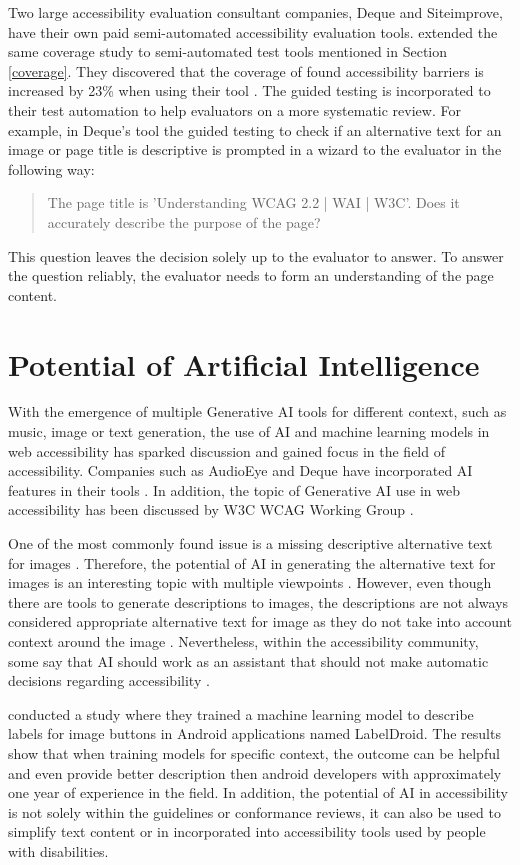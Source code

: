 Two large accessibility evaluation consultant companies, Deque and Siteimprove, have their own paid semi-automated accessibility evaluation tools. \textcite{dequecoverage_semi} extended the same coverage study to semi-automated test tools mentioned in Section \ref{coverage}. They discovered that the coverage of found accessibility barriers is increased by 23\% when using their tool \citep{dequecoverage_semi}. The guided testing is incorporated to their test automation to help evaluators on a more systematic review. For example, in Deque's tool the guided testing to check if an alternative text for an image or page title is descriptive is prompted in a wizard to the evaluator in the following way: \blockquote{The page title is 'Understanding WCAG 2.2 | WAI | W3C'. Does it accurately describe the purpose of the page?}. This question leaves the decision solely up to the evaluator to answer. To answer the question reliably, the evaluator needs to form an understanding of the page content.


\section{Potential of Artificial Intelligence}

With the emergence of multiple Generative AI tools for different context, such as music, image or text generation, the use of AI and machine learning models in web accessibility has sparked discussion and gained focus in the field of accessibility. Companies such as AudioEye and Deque have incorporated AI features in their tools \citep{deque_igt, boia_improve_accessibility}. In addition, the topic of Generative AI use in web accessibility has been discussed by W3C WCAG Working Group \citep{ai_wcag_email}. 

One of the most commonly found issue is a missing descriptive alternative text for images \citep{webaimmillions, dequecoverage}. Therefore, the potential of AI in generating the alternative text for images is an interesting topic with multiple viewpoints \citep{ai_wcag_email, boia_alt_text, potential_for_ai}. However, even though there are tools to generate descriptions to images, the descriptions are not always considered appropriate alternative text for image as they do not take into account context around the image \citep{accessibility_and_ai, boia_alt_text}. Nevertheless, within the accessibility community, some say that AI should work as an assistant that should not make automatic decisions regarding accessibility \citep{ai_wcag_email, accessibility_and_ai}.

\textcite{chen2020unblind} conducted a study where they trained a machine learning model to describe labels for image buttons in Android applications named LabelDroid. The results show that when training models for specific context, the outcome can be helpful and even provide better description then android developers with approximately one year of experience in the field. In addition, the potential of AI in accessibility is not solely within the guidelines or conformance reviews, it can also be used to simplify text content or in incorporated into accessibility tools used by people with disabilities.

